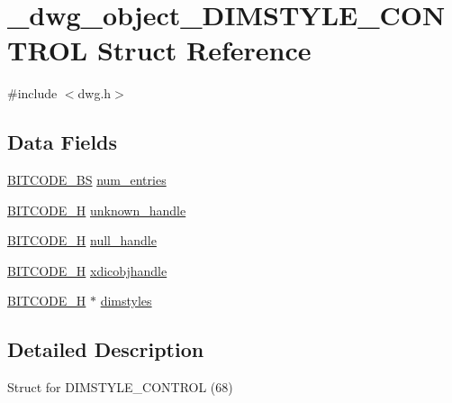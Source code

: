 \hypertarget{struct__dwg__object__DIMSTYLE__CONTROL}{\section{\-\_\-dwg\-\_\-object\-\_\-\-D\-I\-M\-S\-T\-Y\-L\-E\-\_\-\-C\-O\-N\-T\-R\-O\-L \-Struct \-Reference}
\label{struct__dwg__object__DIMSTYLE__CONTROL}
}


{\ttfamily \#include $<$dwg.\-h$>$}

\subsection*{\-Data \-Fields}
\begin{DoxyCompactItemize}
\item 
\hyperlink{dwg_8h_a94297606fbd4a4ff97e8add284af0809}{\-B\-I\-T\-C\-O\-D\-E\-\_\-\-B\-S} \hyperlink{struct__dwg__object__DIMSTYLE__CONTROL_a95f175ac2b1d8c1c1595382cd7576cc9}{num\-\_\-entries}
\item 
\hyperlink{dwg_8h_a7c700e94e047a97ba8c24bdfe4029dc3}{\-B\-I\-T\-C\-O\-D\-E\-\_\-\-H} \hyperlink{struct__dwg__object__DIMSTYLE__CONTROL_a4eabe5e8f6147b83ae3facffbd684263}{unknown\-\_\-handle}
\item 
\hyperlink{dwg_8h_a7c700e94e047a97ba8c24bdfe4029dc3}{\-B\-I\-T\-C\-O\-D\-E\-\_\-\-H} \hyperlink{struct__dwg__object__DIMSTYLE__CONTROL_a836af6319b1e49fde74fcda7a6e2903d}{null\-\_\-handle}
\item 
\hyperlink{dwg_8h_a7c700e94e047a97ba8c24bdfe4029dc3}{\-B\-I\-T\-C\-O\-D\-E\-\_\-\-H} \hyperlink{struct__dwg__object__DIMSTYLE__CONTROL_a15bdee56a4c86ce206eb3d2491c52124}{xdicobjhandle}
\item 
\hyperlink{dwg_8h_a7c700e94e047a97ba8c24bdfe4029dc3}{\-B\-I\-T\-C\-O\-D\-E\-\_\-\-H} $\ast$ \hyperlink{struct__dwg__object__DIMSTYLE__CONTROL_a02f2a4da832de757f93b1fd62f9d2b58}{dimstyles}
\end{DoxyCompactItemize}


\subsection{\-Detailed \-Description}
\-Struct for \-D\-I\-M\-S\-T\-Y\-L\-E\-\_\-\-C\-O\-N\-T\-R\-O\-L (68) 

